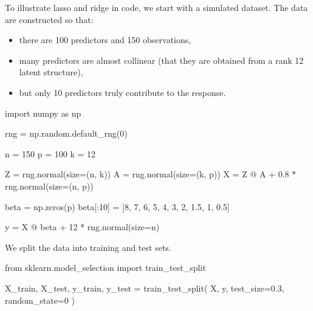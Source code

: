\documentclass[
  letterpaper,
  DIV=11,
  numbers=noendperiod]{scrreprt}
\newenvironment{Shaded}{\begin{snugshade}}{\end{snugshade}}
\newcommand{\DecValTok}[1]{\textcolor[rgb]{0.68,0.00,0.00}{#1}}
\newcommand{\FloatTok}[1]{\textcolor[rgb]{0.68,0.00,0.00}{#1}}
\newcommand{\ImportTok}[1]{\textcolor[rgb]{0.00,0.46,0.62}{#1}}
\newcommand{\NormalTok}[1]{\textcolor[rgb]{0.00,0.23,0.31}{#1}}
\newcommand{\OperatorTok}[1]{\textcolor[rgb]{0.37,0.37,0.37}{#1}}
\providecommand{\tightlist}{%
  \setlength{\itemsep}{0pt}\setlength{\parskip}{0pt}}
\theoremstyle{definition}
\theoremstyle{definition}
\theoremstyle{plain}
\theoremstyle{plain}
\theoremstyle{remark}
\begin{document}
To illustrate lasso and ridge in code, we start with a simulated
dataset. The data are constructed so that:

\begin{itemize}
\tightlist
\item
  there are 100 predictors and 150 observations,
\item
  many predictors are almost collinear (that they are obtained from a
  rank 12 latent structure),
\item
  but only 10 predictors truly contribute to the response.
\end{itemize}

\begin{Shaded}
\begin{Highlighting}[]
\ImportTok{import}\NormalTok{ numpy }\ImportTok{as}\NormalTok{ np}

\NormalTok{rng }\OperatorTok{=}\NormalTok{ np.random.default\_rng(}\DecValTok{0}\NormalTok{)}

\NormalTok{n }\OperatorTok{=} \DecValTok{150}
\NormalTok{p }\OperatorTok{=} \DecValTok{100}
\NormalTok{k }\OperatorTok{=} \DecValTok{12}

\NormalTok{Z }\OperatorTok{=}\NormalTok{ rng.normal(size}\OperatorTok{=}\NormalTok{(n, k))}
\NormalTok{A }\OperatorTok{=}\NormalTok{ rng.normal(size}\OperatorTok{=}\NormalTok{(k, p))}
\NormalTok{X }\OperatorTok{=}\NormalTok{ Z }\OperatorTok{@}\NormalTok{ A }\OperatorTok{+} \FloatTok{0.8} \OperatorTok{*}\NormalTok{ rng.normal(size}\OperatorTok{=}\NormalTok{(n, p))}

\NormalTok{beta }\OperatorTok{=}\NormalTok{ np.zeros(p)}
\NormalTok{beta[:}\DecValTok{10}\NormalTok{] }\OperatorTok{=}\NormalTok{ [}\DecValTok{8}\NormalTok{, }\DecValTok{7}\NormalTok{, }\DecValTok{6}\NormalTok{, }\DecValTok{5}\NormalTok{, }\DecValTok{4}\NormalTok{, }\DecValTok{3}\NormalTok{, }\DecValTok{2}\NormalTok{, }\FloatTok{1.5}\NormalTok{, }\DecValTok{1}\NormalTok{, }\FloatTok{0.5}\NormalTok{]}

\NormalTok{y }\OperatorTok{=}\NormalTok{ X }\OperatorTok{@}\NormalTok{ beta }\OperatorTok{+} \DecValTok{12} \OperatorTok{*}\NormalTok{ rng.normal(size}\OperatorTok{=}\NormalTok{n)}
\end{Highlighting}
\end{Shaded}

We split the data into training and test sets.

\begin{Shaded}
\begin{Highlighting}[]
\ImportTok{from}\NormalTok{ sklearn.model\_selection }\ImportTok{import}\NormalTok{ train\_test\_split}

\NormalTok{X\_train, X\_test, y\_train, y\_test }\OperatorTok{=}\NormalTok{ train\_test\_split(}
\NormalTok{    X, y, test\_size}\OperatorTok{=}\FloatTok{0.3}\NormalTok{, random\_state}\OperatorTok{=}\DecValTok{0}
\NormalTok{)}
\end{Highlighting}
\end{Shaded}
\end{document}
